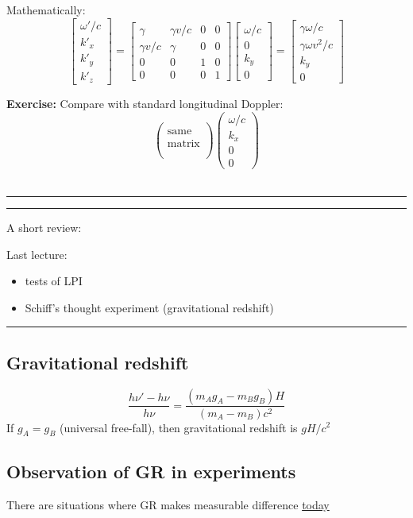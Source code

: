 \documentclass[a4paper]{article} %
\newcommand{\exercise}[2]
{
\begin{framed}
\textbf{Exercise:} #1 \\\hrule
#2
\end{framed}
}
\newcommand{\review}[1]
{
\hrule
A short review:

#1
\hrule
}
\newcommand{\bmx}[1]{
\begin{bmatrix}
#1
\end{bmatrix}
}
\newcommand{\pmx}[1]{
\begin{pmatrix}
#1
\end{pmatrix}
}
\begin{document}
Mathematically:
\begin{equation}
\bmx{\omega'/c\\k'_x\\k'_y\\k'_z}=
\bmx{
\gamma&\gamma v/c&0&0\\
\gamma v/c&\gamma&0&0\\
0&0&1&0\\
0&0&0&1
}
\bmx{
\omega/c\\0\\k_y\\0
}=
\bmx{
\gamma\omega/c\\
\gamma\omega v^2/c\\
k_y\\
0
}
\end{equation}

\exercise{Compare with standard longitudinal Doppler:
\begin{equation}
\pmx{\\\text{same}\\\text{matrix}\\\\}\pmx{\omega/c\\k_x\\0\\0}
\end{equation}
}
{}

\review{Last lecture:
\begin{itemize}
\item tests of LPI
\item Schiff's thought experiment (gravitational redshift)
\end{itemize}
}

\subsection{Gravitational redshift}
\begin{equation}
\frac{h\nu'-h\nu}{h\nu}=\frac{(m_A g_A - m_B g_B)H}{(m_A-m_B)c^2}
\end{equation}
If $g_A=g_B$ (universal free-fall), then gravitational redshift is $gH/c^2$

\subsection{Observation of GR in experiments}
There are situations where GR makes measurable difference \underline{today}
\end{document}
